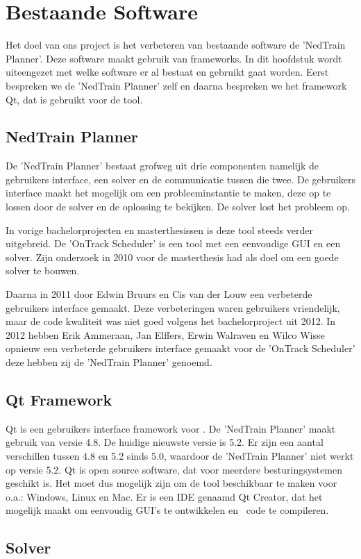 \section{Bestaande Software}
Het doel van ons project is het verbeteren van bestaande software de 'NedTrain Planner'. Deze software maakt gebruik van frameworks. In dit hoofdstuk wordt uiteengezet met welke software er al bestaat en gebruikt gaat worden. Eerst bespreken we de 'NedTrain Planner' zelf en daarna bespreken we het framework Qt, dat is gebruikt voor de tool. 

\subsection{NedTrain Planner}
De 'NedTrain Planner' bestaat grofweg uit drie componenten namelijk de gebruikers interface, een solver en de communicatie tussen die twee. De gebruikers interface maakt het mogelijk om een probleeminstantie te maken, deze op te lossen door de solver en de oplossing te bekijken. De solver lost het probleem op.

In vorige bachelorprojecten en masterthesissen is deze tool steeds verder uitgebreid. De 'OnTrack Scheduler' is een tool met een eenvoudige GUI en een solver. Zijn onderzoek in 2010 voor de masterthesis had als doel om een goede solver te bouwen. \cite{ronaldevers2010}

Daarna in 2011 door Edwin Bruurs en Cis van der Louw een verbeterde gebruikers interface gemaakt.\cite{bep2011nedtrain} Deze verbeteringen waren gebruikers vriendelijk, maar de code kwaliteit was niet goed volgens het bachelorproject uit 2012.\cite{bep2012nedtrain} In 2012 hebben Erik Ammeraan, Jan Elffers, Erwin Walraven en Wilco Wisse opnieuw een verbeterde gebruikers interface gemaakt voor de 'OnTrack Scheduler' deze hebben zij de 'NedTrain Planner' genoemd.

\subsection{Qt Framework}
Qt is een gebruikers interface framework voor \cpp . De 'NedTrain Planner' maakt gebruik van versie 4.8. De huidige nieuwste versie is 5.2. Er zijn een aantal verschillen tussen 4.8 en 5.2 sinds 5.0, waardoor de 'NedTrain Planner' niet werkt op versie 5.2. Qt is open source software, dat voor meerdere besturingsystemen geschikt is. Het moet dus mogelijk zijn om de tool beschikbaar te maken voor o.a.: Windows, Linux en Mac. Er is een IDE genaamd Qt Creator, dat het mogelijk maakt om eenvoudig GUI's te ontwikkelen en \cpp\ code te compileren. \cite{seminarium2014}

\subsection{Solver}

